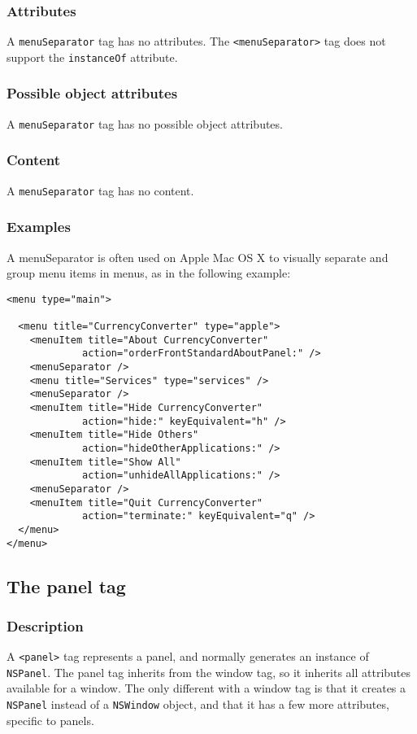 \subsubsection{Attributes}
A \texttt{menuSeparator} tag has no attributes.  The
\texttt{<menuSeparator>} tag does not support the \texttt{instanceOf}
attribute.

\subsubsection{Possible object attributes}
A \texttt{menuSeparator} tag has no possible object attributes.

\subsubsection{Content}
A \texttt{menuSeparator} tag has no content.

\subsubsection{Examples}
A menuSeparator is often used on Apple Mac OS X to visually separate and
group menu items in menus, as in the following example:
\begin{verbatim}
<menu type="main">

  <menu title="CurrencyConverter" type="apple">
    <menuItem title="About CurrencyConverter" 
             action="orderFrontStandardAboutPanel:" />
    <menuSeparator />
    <menu title="Services" type="services" />
    <menuSeparator />
    <menuItem title="Hide CurrencyConverter" 
             action="hide:" keyEquivalent="h" />
    <menuItem title="Hide Others" 
             action="hideOtherApplications:" />
    <menuItem title="Show All" 
             action="unhideAllApplications:" />
    <menuSeparator />
    <menuItem title="Quit CurrencyConverter" 
             action="terminate:" keyEquivalent="q" />
  </menu>
</menu>
\end{verbatim}

\subsection{The panel tag}

\subsubsection{Description}
A \texttt{<panel>} tag represents a panel, and normally generates an
instance of \texttt{NSPanel}.  The panel tag inherits from the window
tag, so it inherits all attributes available for a window.  The only
different with a window tag is that it creates a \texttt{NSPanel}
instead of a \texttt{NSWindow} object, and that it has a few more
attributes, specific to panels.

